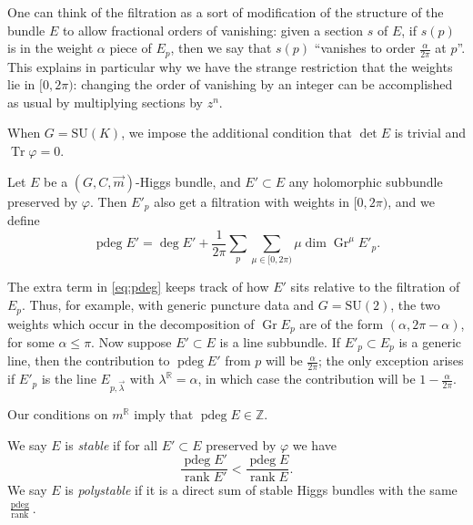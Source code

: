 \documentclass[12pt,letterpaper,reqno]{article}
\numberwithin{equation}{section}
\newcommand{\R}{\ensuremath{\mathbb R}}
\newcommand{\Z}{\ensuremath{\mathbb Z}}
\newcommand{\ti}[1]{\textit{#1}}
\DeclareMathOperator{\Tr}{Tr}
\DeclareMathOperator{\rank}{rank}
\DeclareMathOperator{\pdeg}{pdeg}
\DeclareMathOperator{\Gr}{Gr}
\newcommand{\SU}{\mathrm{SU}}
\newcommand{\fixme}[1]{{\color{orange}{[#1]}}}
\begin{document}
\begin{remark}
One can think of the filtration as a sort of modification
of the structure of the bundle $E$ to allow fractional
orders of vanishing: given a section
$s$ of $E$, if $s(p)$ is in the weight $\alpha$ piece of $E_p$,
then we say that $s(p)$  ``vanishes to order $\frac{\alpha}{2\pi}$ at $p$''. This explains in particular why we have the strange
restriction that the weights lie in $[0,2\pi)$: changing the order
of vanishing by an integer can be accomplished as usual by multiplying sections by $z^n$.
\end{remark}

\begin{defn}[Parabolic Higgs bundles for $G = \SU(K)$]
When $G = \SU(K)$, we impose the additional condition that
$\det E$ is trivial \fixme{in the parabolic sense...} and 
$\Tr \varphi = 0$.
\end{defn}

\begin{defn}
Let $E$ be a $(G, C, \vec m)$-Higgs bundle,
and $E' \subset E$ any holomorphic subbundle preserved by
$\varphi$. Then $E'_p$ also get a filtration with
weights in $[0,2\pi)$, and we define
\begin{equation} \label{eq:pdeg}
  \pdeg E' = \deg E' + \frac{1}{2\pi} \sum_p \sum_{\mu \in [0,2\pi)} \mu \dim \Gr^\mu E'_p.
\end{equation}
\end{defn}

The extra term in \eqref{eq:pdeg} keeps track of how $E'$
sits relative to the filtration of $E_p$.
Thus, for example, with generic puncture data and $G = \SU(2)$,
the two weights which occur in the decomposition of 
$\Gr E_p$ are of the form
$(\alpha, 2\pi-\alpha)$, for some $\alpha \le \pi$.
Now suppose $E' \subset E$ is a line subbundle.
If $E'_p \subset E_p$ is a generic line, then the contribution
to $\pdeg E'$ from $p$ will be $\frac{\alpha}{2\pi}$; the
only exception arises if $E'_p$ is the line 
$E_{p,\vec\lambda}$ with $\lambda^\R = \alpha$, in which case 
the contribution will be $1 - \frac{\alpha}{2\pi}$. 

\begin{remark}Our conditions on $m^\R$ imply that $\pdeg E \in \Z$.
\end{remark}

\begin{defn}
We say $E$ is \ti{stable} if for all $E' \subset E$ preserved
by $\varphi$ we have
\begin{equation}
  \frac{\pdeg E'}{\rank E'} < \frac{\pdeg E}{\rank E}.
\end{equation}
We say $E$ is \ti{polystable} if it is a direct sum of
stable Higgs bundles with the same $\frac{\pdeg}{\rank}$.
\end{defn}
\end{document}
